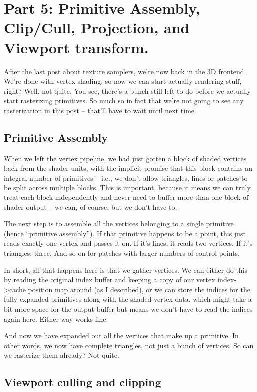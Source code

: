 \documentclass[12pt]{article}
\begin{document}
\section{Part 5: Primitive Assembly, Clip/Cull, Projection, and Viewport transform.}
\label{sec:orgb979c88}
\label{part5}

After the last post about texture samplers, we’re now back in the 3D frontend. We’re done with vertex shading, so now we can start actually rendering stuff, right? Well, not quite. You see, there’s a bunch still left to do before we actually start rasterizing primitives. So much so in fact that we’re not going to see any rasterization in this post – that’ll have to wait until next time.

\subsection{Primitive Assembly}
\label{sec:org6c7a9cd}

When we left the vertex pipeline, we had just gotten a block of shaded vertices back from the shader units, with the implicit promise that this block contains an integral number of primitives – i.e., we don’t allow triangles, lines or patches to be split across multiple blocks. This is important, because it means we can truly treat each block independently and never need to buffer more than one block of shader output – we can, of course, but we don’t have to.

The next step is to assemble all the vertices belonging to a single primitive (hence “primitive assembly”). If that primitive happens to be a point, this just reads exactly one vertex and passes it on. If it’s lines, it reads two vertices. If it’s triangles, three. And so on for patches with larger numbers of control points.

In short, all that happens here is that we gather vertices. We can either do this by reading the original index buffer and keeping a copy of our vertex index->cache position map around (as I described), or we can store the indices for the fully expanded primitives along with the shaded vertex data, which might take a bit more space for the output buffer but means we don’t have to read the indices again here. Either way works fine.

And now we have expanded out all the vertices that make up a primitive. In other words, we now have complete triangles, not just a bunch of vertices. So can we rasterize them already? Not quite.

\subsection{Viewport culling and clipping}
\label{sec:org47b495b}
\end{document}
